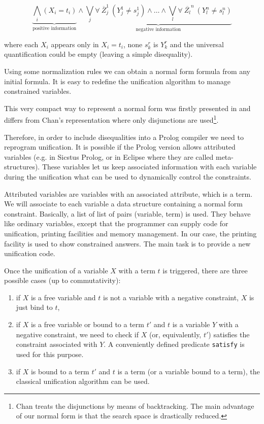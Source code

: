 \documentclass[]{llncs}
\begin{document}
\[ \underbrace{\bigwedge_i (X_i = t_i)}_{\mbox{positive information}} \wedge
\underbrace{\bigvee_j \forall~ \overline{Z}_j^1~(Y_j^1 \neq s_j^1)
\wedge \ldots \wedge \bigvee_l \forall~ \overline{Z_l}^n~(Y_l^n
\neq s_l^n)}_{\mbox{negative information}} \]

\noindent
where each $X_i$ appears only in $X_i = t_i$, none $s_k^r$ is $Y_k^r$
and the universal quantification could be
empty (leaving a simple disequality).

Using some normalization rules we can obtain a normal form
formula from any initial formula. It is easy to redefine
the unification algorithm to manage constrained variables.

This very compact way to represent a normal form was firstly presented in
\cite{Moreno1} and differs from Chan's representation where
only disjunctions are used\footnote{Chan treats the disjunctions
by means of backtracking. The main advantage of our normal form is
that the search space is drastically reduced.}.

Therefore, in order to include disequalities into a Prolog compiler we
need to reprogram unification. It is possible if the Prolog version
allows attributed variables \cite{Carlsson} (e.g. in Sicstus Prolog,
or in Eclipse where they are called meta-structures). These
variables let us keep associated information with each variable during
the unification what can be used to dynamically control the
constraints.

Attributed variables are variables with an associated attribute,
which is a term. We will associate to each variable a data structure
containing a normal form constraint. Basically, a list of list of
pairs (variable, term) is used. They behave like ordinary
variables, except that the programmer can supply code for
unification, printing facilities and memory management.
In our case, the printing facility is used to show constrained
answers. The main task is to provide a new unification code.

Once the unification of a variable $X$ with a term $t$ is
triggered, there are three possible cases (up to
commutativity):

\begin{enumerate}
\item if $X$ is a free variable and $t$ is not a variable with a negative
constraint, $X$ is just bind to $t$,
\item if $X$ is a free variable or bound to a term $t'$ and
$t$ is a variable $Y$ with a negative constraint, we need to check
if $X$ (or, equivalently, $t'$) satisfies the constraint associated with $Y$.
A conveniently defined predicate {\tt satisfy} is used for this purpose.
\item if $X$ is bound to a term $t'$ and $t$ is a term (or a variable
bound to a term), the classical unification algorithm can be used.
\end{enumerate}
\end{document}
